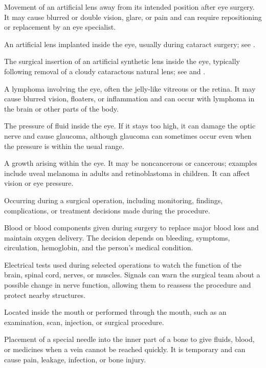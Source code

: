  Movement of an artificial lens away from its intended position after eye surgery. It may cause blurred or double vision, glare, or pain and can require repositioning or replacement by an eye specialist.

 An artificial lens implanted inside the eye, usually during cataract surgery; see .

 The surgical insertion of an artificial synthetic lens inside the eye, typically following removal of a cloudy cataractous natural lens; see  and .

 A lymphoma involving the eye, often the jelly-like vitreous or the retina. It may cause blurred vision, floaters, or inflammation and can occur with lymphoma in the brain or other parts of the body.

 The pressure of fluid inside the eye. If it stays too high, it can damage the optic nerve and cause glaucoma, although glaucoma can sometimes occur even when the pressure is within the usual range.

 A growth arising within the eye. It may be noncancerous or cancerous; examples include uveal melanoma in adults and retinoblastoma in children. It can affect vision or eye pressure.

 Occurring during a surgical operation, including monitoring, findings, complications, or treatment decisions made during the procedure.

 Blood or blood components given during surgery to replace major blood loss and maintain oxygen delivery. The decision depends on bleeding, symptoms, circulation, hemoglobin, and the person’s medical condition.

 Electrical tests used during selected operations to watch the function of the brain, spinal cord, nerves, or muscles. Signals can warn the surgical team about a possible change in nerve function, allowing them to reassess the procedure and protect nearby structures.

 Located inside the mouth or performed through the mouth, such as an examination, scan, injection, or surgical procedure.

 Placement of a special needle into the inner part of a bone to give fluids, blood, or medicines when a vein cannot be reached quickly. It is temporary and can cause pain, leakage, infection, or bone injury.

